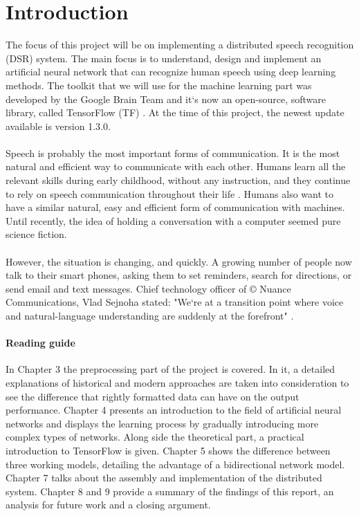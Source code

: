 \chapter{Introduction}\label{ch:introduction}

The focus of this project will be on implementing a distributed speech recognition (DSR) system.
The main focus is to understand, design and implement an artificial neural network that can recognize human speech using deep learning methods.
The toolkit that we will use for the machine learning part was developed by the Google Brain Team and it`s now an open-source, software library, called TensorFlow (TF) \cite{tensorflow2015-whitepaper}.
At the time of this project, the newest update available is version 1.3.0.\\\\
Speech is probably the most important forms of communication.
It is the most natural and efficient way to communicate with
each other. Humans learn all the relevant skills during early
childhood, without any instruction, and they continue to rely
on speech communication throughout their life \cite{kamblespeech}.
Humans also want to have a similar natural, easy and efficient form of communication with machines. 
Until recently, the idea of holding a conversation with a computer seemed pure science fiction.\\\\
However, the situation is changing, and quickly.
A growing number of people now talk to their smart phones, asking them to set reminders, search for directions, or send email and text messages.
Chief technology officer of \copyright{} Nuance Communications, Vlad Sejnoha stated: "We`re at a transition point where voice and natural-language understanding are suddenly at the forefront" \cite{kamblespeech}.\\

\subsubsection{Reading guide}

In Chapter 3 the preprocessing part of the project is covered. In it, a detailed explanations of historical and modern approaches are taken into consideration to see the difference that rightly formatted data can have on the output performance.
Chapter 4 presents an introduction to the field of artificial neural networks and displays the learning process by gradually introducing more complex types of networks. Along side the theoretical part, a practical introduction to TensorFlow is given. Chapter 5 shows the difference between three working models, detailing the advantage of a bidirectional network model. Chapter 7 talks about the assembly and implementation of the distributed system. Chapter 8 and 9 provide a summary of the findings of this report, an analysis for future work and a closing argument. 